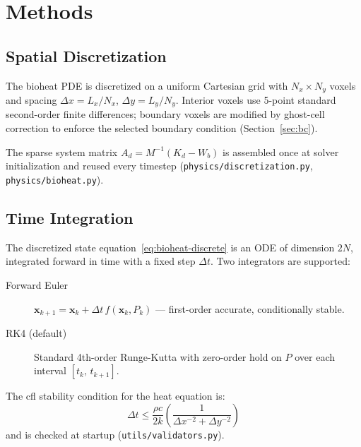 \chapter{Methods}
\label{ch:methods}

\section{Spatial Discretization}

The bioheat PDE is discretized on a uniform Cartesian grid with
$N_x \times N_y$ voxels and spacing $\Delta x = L_x / N_x$,
$\Delta y = L_y / N_y$.
Interior voxels use 5-point standard second-order finite differences;
boundary voxels are modified by ghost-cell correction to enforce
the selected boundary condition (Section~\ref{sec:bc}).

The sparse system matrix $A_d = M^{-1}(K_d - W_b)$ is assembled once
at solver initialization and reused every timestep
(\texttt{physics/discretization.py}, \texttt{physics/bioheat.py}).

\section{Time Integration}

The discretized state equation~\eqref{eq:bioheat-discrete} is an ODE
of dimension $2N$, integrated forward in time with a fixed step $\Delta t$.
Two integrators are supported:

\begin{description}
    \item[Forward Euler] $\mathbf{x}_{k+1} = \mathbf{x}_k + \Delta t\,f(\mathbf{x}_k, P_k)$
        — first-order accurate, conditionally stable.
    \item[RK4 (default)] Standard 4th-order Runge-Kutta with
        zero-order hold on $P$ over each interval $[t_k,\, t_{k+1}]$.
\end{description}

The \gls{cfl} stability condition for the heat equation is:
\begin{equation}
    \Delta t \leq \frac{\rho c}{2k}
    \left(\frac{1}{\Delta x^{-2} + \Delta y^{-2}}\right)
\end{equation}
and is checked at startup (\texttt{utils/validators.py}).


